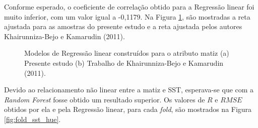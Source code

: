 Conforme esperado, o coeficiente de correlação obtido para a Regressão linear foi muito inferior, com um valor igual a -0,1179. Na Figura \ref{fig:comp_hue}, são mostradas a reta ajustada para as amostras do presente estudo e a reta ajustada pelos autores Khairunniza-Bejo e Kamarudin (2011). 

\begin{figure}[H]
\centering
    \caption{\label{fig:comp_hue} Modelos de Regressão linear construídos para o atributo matiz (a) Presente estudo (b) Trabalho de Khairunniza-Bejo e Kamarudin (2011).}
\end{figure}

Devido ao relacionamento não linear entre a matiz e SST, esperava-se que com a \textit{Random Forest} fosse obtido um resultado superior. Os valores de $R$ e $RMSE$ obtidos por ela e pela Regressão linear, para cada \textit{fold}, são mostrados na Figura \ref{fig:fold_sst_hue}.

